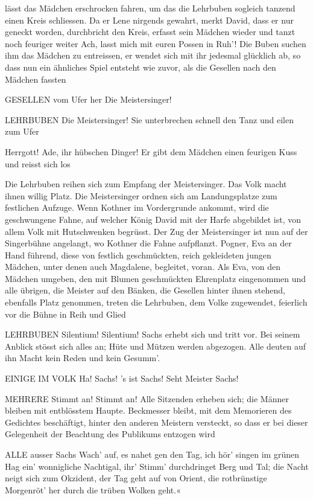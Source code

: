 \begin{drama}
\Davidspeaks
lässt das Mädchen erschrocken fahren, um das die Lehrbuben sogleich tanzend einen Kreis schliessen. Da er Lene nirgends gewahrt, merkt David, dass er nur geneckt worden, durchbricht den Kreis, erfasst sein Mädchen wieder und tanzt noch feuriger weiter
Ach, lasst mich mit euren Possen in Ruh'!
Die Buben suchen ihm das Mädchen zu entreissen, er wendet sich mit ihr jedesmal glücklich ab, so dass nun ein ähnliches Spiel entsteht wie zuvor, als die Gesellen nach den Mädchen fassten

GESELLEN
vom Ufer her
Die Meistersinger!

LEHRBUBEN
Die Meistersinger!
Sie unterbrechen schnell den Tanz und eilen zum Ufer

\Davidspeaks
Herrgott! Ade, ihr hübschen Dinger!
Er gibt dem Mädchen einen feurigen Kuss und reisst sich los

Die Lehrbuben reihen sich zum Empfang der Meistersinger. Das Volk macht ihnen willig Platz. Die Meistersinger ordnen sich am Landungsplatze zum festlichen Aufzuge. Wenn Kothner im Vordergrunde ankommt, wird die geschwungene Fahne, auf welcher König David mit der Harfe abgebildet ist, von allem Volk mit Hutschwenken begrüsst. Der Zug der Meistersinger ist nun auf der Singerbühne angelangt, wo Kothner die Fahne aufpflanzt. Pogner, Eva an der Hand führend, diese von festlich geschmückten, reich gekleideten jungen Mädchen, unter denen auch Magdalene, begleitet, voran. Als Eva, von den Mädchen umgeben, den mit Blumen geschmückten Ehrenplatz eingenommen und alle übrigen, die Meister auf den Bänken, die Gesellen hinter ihnen stehend, ebenfalls Platz genommen, treten die Lehrbuben, dem Volke zugewendet, feierlich vor die Bühne in Reih und Glied

LEHRBUBEN
Silentium! Silentium!
Sachs erhebt sich und tritt vor. Bei seinem Anblick stösst sich alles an; Hüte und Mützen werden abgezogen. Alle deuten auf ihn
Macht kein Reden und kein Gesumm'.

EINIGE IM VOLK
Ha! Sachs! 's ist Sachs!
Seht Meister Sachs!

MEHRERE
Stimmt an! Stimmt an!
Alle Sitzenden erheben sich; die Männer bleiben mit entblösstem Haupte. Beckmesser bleibt, mit dem Memorieren des Gedichtes beschäftigt, hinter den anderen Meistern versteckt, so dass er bei dieser Gelegenheit der Beachtung des Publikums entzogen wird

ALLE
ausser Sachs
Wach' auf, es nahet gen den Tag,
ich hör' singen im grünen Hag
ein' wonnigliche Nachtigal,
ihr' Stimm' durchdringet Berg und Tal;
die Nacht neigt sich zum Okzident,
der Tag geht auf von Orient,
die rotbrünstige Morgenröt'
her durch die trüben Wolken geht.«


\end{drama}
